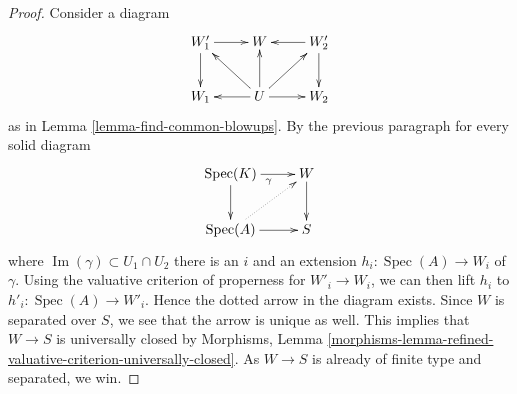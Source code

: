 \documentclass[10pt,a4paper]{amsart}
\theoremstyle{plain}
\theoremstyle{definition}
\theoremstyle{remark}
\numberwithin{equation}{subsection}
\def\Spec{\mathop{\mathrm{Spec}}}
\def\Im{\mathop{\mathrm{Im}}}
\begin{document}
\begin{proof}
\medskip\noindent
Consider a diagram
$$
\xymatrix{
W_1' \ar[d] \ar[r] & W & W_2' \ar[l] \ar[d] \\
W_1 & U \ar[l] \ar[lu] \ar[u] \ar[ru] \ar[r] & W_2
}
$$
as in Lemma \ref{lemma-find-common-blowups}. By the previous paragraph
for every solid diagram
$$
\xymatrix{
\Spec(K) \ar[r]_\gamma  \ar[d] & W \ar[d] \\
\Spec(A) \ar@{..>}[ru] \ar[r] & S
}
$$
where $\Im(\gamma) \subset U_1 \cap U_2$ there is an $i$ and
an extension $h_i : \Spec(A) \to W_i$ of $\gamma$.
Using the valuative criterion of properness for $W'_i \to W_i$,
we can then lift $h_i$ to $h'_i : \Spec(A) \to W'_i$.
Hence the dotted arrow in the diagram exists. Since $W$
is separated over $S$, we see that the arrow is unique as well.
This implies that $W \to S$ is universally closed by
Morphisms, Lemma
\ref{morphisms-lemma-refined-valuative-criterion-universally-closed}.
As $W \to S$ is already of finite type and separated, we win.
\end{proof}
\end{document}
